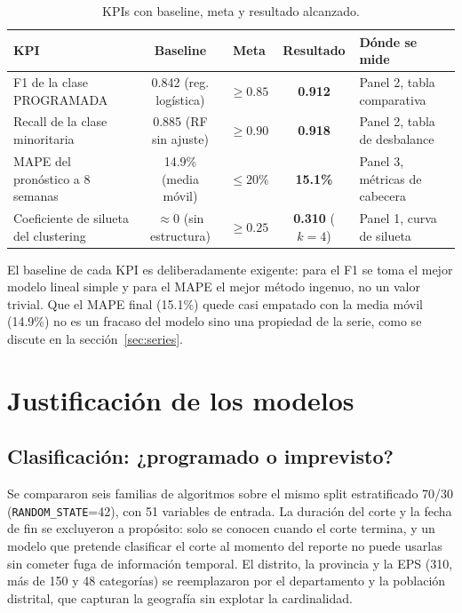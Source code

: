 \documentclass[11pt,a4paper]{article}
\begin{document}
\begin{table}[h]
      \centering
      \small
      \begin{tabular}{p{4.6cm}cccl}
            \toprule
            \textbf{KPI}                          & \textbf{Baseline}            & \textbf{Meta} & \textbf{Resultado}     & \textbf{Dónde se mide}        \\
            \midrule
            F1 de la clase PROGRAMADA             & 0.842 (reg. logística)       & $\geq 0.85$   & \textbf{0.912}         & Panel 2, tabla comparativa    \\
            Recall de la clase minoritaria        & 0.885 (RF sin ajuste)        & $\geq 0.90$   & \textbf{0.918}         & Panel 2, tabla de desbalance  \\
            MAPE del pronóstico a 8 semanas       & 14.9\% (media móvil)         & $\leq 20\%$   & \textbf{15.1\%}        & Panel 3, métricas de cabecera \\
            Coeficiente de silueta del clustering & $\approx 0$ (sin estructura) & $\geq 0.25$   & \textbf{0.310} ($k=4$) & Panel 1, curva de silueta     \\
            \bottomrule
      \end{tabular}
      \caption{KPIs con baseline, meta y resultado alcanzado.}
\end{table}

El baseline de cada KPI es deliberadamente exigente: para el F1 se toma el mejor
modelo lineal simple y para el MAPE el mejor método ingenuo, no un valor trivial.
Que el MAPE final (15.1\%) quede casi empatado con la media móvil (14.9\%) no
es un fracaso del modelo sino una propiedad de la serie, como se discute en la
sección~\ref{sec:series}.

\section{Justificación de los modelos}

\subsection{Clasificación: ¿programado o imprevisto?}

Se compararon seis familias de algoritmos sobre el mismo split estratificado
70/30 (\texttt{RANDOM\_STATE}=42), con 51 variables de entrada. La duración del
corte y la fecha de fin se excluyeron a propósito: solo se conocen cuando el
corte termina, y un modelo que pretende clasificar el corte al momento del
reporte no puede usarlas sin cometer fuga de información temporal. El distrito,
la provincia y la EPS (310, más de 150 y 48 categorías) se reemplazaron por el
departamento y la población distrital, que capturan la geografía sin explotar la
cardinalidad.
\end{document}
